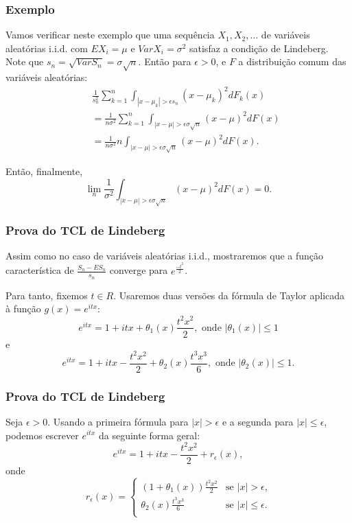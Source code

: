 \begin{frame}
\frametitle{\textbf{Exemplo}}


\begin{exem}
Vamos verificar neste exemplo que uma sequência $X_1,X_2,\ldots$ de
variáveis aleatórias i.i.d. com $EX_i=\mu$ e $Var X_i=\sigma^2$
satisfaz a condição de Lindeberg. Note que $s_n=\sqrt{Var
S_n}=\sigma\sqrt{n}$. Então para $\epsilon>0$, e $F$ a distribuição
comum das variáveis aleatórias:
\begin{eqnarray}
& & \frac{1}{s_n^2}\sum_{k=1}^{n}\int_{|x-\mu_k|>\epsilon
s_n}(x-\mu_k)^2dF_k(x)\nonumber\\
& & =\frac{1}{n\sigma^2}\sum_{k=1}^{n}\int_{|x-\mu|>\epsilon
\sigma\sqrt{n}}(x-\mu)^2dF(x) \nonumber\\
& & =\frac{1}{n\sigma^2}n\int_{|x-\mu|>\epsilon
\sigma\sqrt{n}}(x-\mu)^2dF(x). \nonumber
\end{eqnarray}

Então, finalmente,
$$\lim_n\frac{1}{\sigma^2}\int_{|x-\mu|>\epsilon
\sigma\sqrt{n}}(x-\mu)^2dF(x)=0.$$
\end{exem}

\end{frame}

\begin{frame}
\frametitle{\textbf{Prova do TCL de Lindeberg}}
\baselineskip=13pt
\begin{block}{}

Assim como no caso de variáveis aleatórias i.i.d., mostraremos
que a função característica de $\frac{S_n-ES_n}{s_n}$ converge para
$e^{\frac{-t^2}{2}}$.

Para tanto, fixemos $t\in R$. Usaremos duas versões da fórmula de
Taylor aplicada à função $g(x)=e^{itx}$:
$$e^{itx}=1+itx+\theta_1(x)\frac{t^2x^2}{2},\mbox{ onde }|\theta_1(x)|\leq 1$$
e
$$e^{itx}=1+itx-\frac{t^2x^2}{2}+ \theta_2(x)\frac{t^3x^3}{6},\mbox{ onde }|\theta_2(x)|\leq 1.$$

\end{block}
\end{frame}

\begin{frame}
\frametitle{\textbf{Prova do TCL de Lindeberg}}
\baselineskip=13pt
\begin{block}{}


Seja $\epsilon>0$. Usando a primeira fórmula para $|x|>\epsilon$ e a
segunda para $|x|\leq \epsilon$, podemos escrever $e^{itx}$ da
seguinte forma geral:
$$e^{itx}=1+itx-\frac{t^2x^2}{2}+r_{\epsilon}(x),$$
onde
\[
r_{\epsilon}(x)= \left\{
\begin{array}{ll}
(1+\theta_1(x))\frac{t^2x^2}{2} & \mbox{se $|x|>\epsilon$,} \\
\theta_2(x)\frac{t^3x^3}{6} & \mbox{se $|x|\leq\epsilon$.} \\
\end{array}
\right.
\]

\end{block}
\end{frame}

